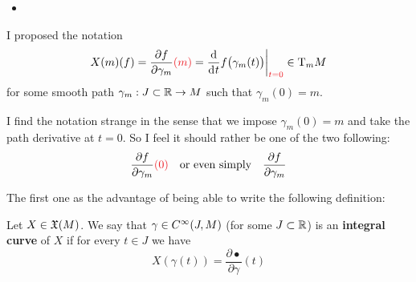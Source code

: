 	\begin{itemize}
		\item 
	\end{itemize}

	I proposed the notation
	$$
		X(m)(f) = \frac{\partial{f}}{\partial{\gamma_m}}{\color{Red}(m)} = \frac{\d}{\di{t}} f\big( \gamma_m(t) \big) \bigg|_{\color{Red}t=0} \in \T_m{M}
	$$
	for some smooth path $\gamma_m: J \subset \mathbb{R} \to M$ such that $\gamma_m(0) = m$.

	I find the notation strange in the sense that we impose $\gamma_m(0) = m$ and take the path derivative at $t=0$. So I feel it should rather be one of the two following:
	$$
		\frac{\partial{f}}{\partial{\gamma_m}}{\color{Red}(0)} \quad \text{or even simply} \quad \frac{\partial{f}}{\partial{\gamma_m}}
	$$

	The first one as the advantage of being able to write the following definition:

	\begin{definition}
		Let $X \in \mathfrak{X}(M)$.
		We say that $\gamma \in C^\infty(J,M)$ (for some $J \subset \mathbb{R}$) is an \textbf{integral curve} of $X$ if for every $t \in J$ we have
		$$
			X(\gamma(t)) = \frac{\partial \bullet}{\partial \gamma}(t)
		$$

		




	\end{definition}


